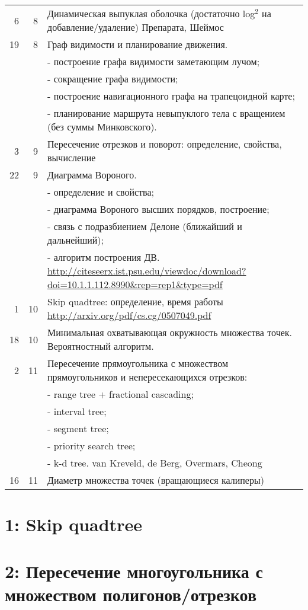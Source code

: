 \documentclass[11pt]{article}
\begin{document}
\begin{center}
\begin{tabular}{rrl}
6 & 8 & Динамическая выпуклая оболочка (достаточно log$^{\text{2}}$ на добавление/удаление)        Препарата, Шеймос\\
19 & 8 & Граф видимости и планирование движения.\\
 &  & - построение графа видимости заметающим лучом;\\
 &  & - сокращение графа видимости;\\
 &  & - построение навигационного графа на трапецоидной карте;\\
 &  & - планирование маршрута невыпуклого тела с вращением (без суммы Минковского).\\
3 & 9 & Пересечение отрезков и поворот: определение, свойства, вычисление\\
22 & 9 & Диаграмма Вороного.\\
 &  & - определение и свойства;\\
 &  & - диаграмма Вороного высших порядков, построение;\\
 &  & - связь с подразбиением Делоне (ближайший и дальнейший);\\
 &  & - алгоритм построения ДВ.  \url{http://citeseerx.ist.psu.edu/viewdoc/download?doi=10.1.1.112.8990&rep=rep1&type=pdf}\\
1 & 10 & Skip quadtree: определение, время работы        \url{http://arxiv.org/pdf/cs.cg/0507049.pdf}\\
18 & 10 & Минимальная охватывающая окружность множества точек. Вероятностный алгоритм.\\
2 & 11 & Пересечение прямоугольника с множеством прямоугольников и непересекающихся отрезков:\\
 &  & - range tree + fractional cascading;\\
 &  & - interval tree;\\
 &  & - segment tree;\\
 &  & - priority search tree;\\
 &  & - k-d tree.        van Kreveld, de Berg, Overmars, Cheong\\
16 & 11 & Диаметр множества точек (вращающиеся калиперы)\\
\hline
\end{tabular}
\end{center}
\section{{\bfseries{}} 1:  Skip quadtree}
\label{sec-2}
\section{{\bfseries{}} 2:  Пересечение многоугольника с множеством полигонов/отрезков}
\label{sec-3}
\end{document}
